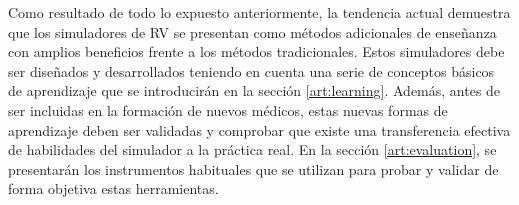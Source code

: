 Como resultado de todo lo expuesto anteriormente, la tendencia actual demuestra que los simuladores de \ac{RV} se presentan como métodos adicionales de enseñanza con amplios beneficios frente a los métodos tradicionales. Estos simuladores debe ser diseñados y desarrollados teniendo en cuenta una serie de conceptos básicos de aprendizaje que se introducirán  en la sección \ref{art:learning}.
Además, antes de ser incluidas en la formación de nuevos médicos, estas nuevas formas de aprendizaje deben ser validadas y comprobar que existe una transferencia efectiva de habilidades del simulador a la práctica real. En la sección \ref{art:evaluation}, se presentarán los instrumentos habituales que se utilizan para probar y validar de forma objetiva estas herramientas.








